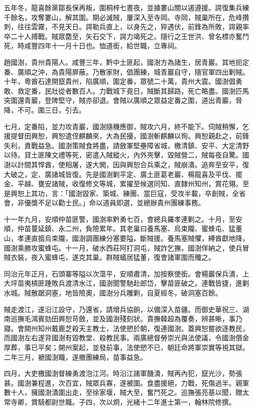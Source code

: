 \begin{pinyinscope}
五年冬，龍喜餘黨鄒長保再叛，圍桐梓七晝夜，並據婁山關以遏遵援。諤復集兵練千餘名，攻奪婁山，解其圍。期必滅賊，屢深入至寺岡。寺岡，賊巢所在，危峰攢刺，往往雲霧，不見天日。諤勒兵直上，以身先之，猝遇伏，前鋒為所敗，諤親率卒二十人搏戰。賊眾麕至，矢石交下，諤力竭死之。隨行之王世洪、曾名標亦奮鬥死，時咸豐四年十一月十日也。恤道銜，給世職，立專祠。

趙國澍，貴州貴陽人。咸豐三年，黔中土匪起，國澍方為諸生，居青巖。其地扼定番、廣順之沖，為貴陽屏蔽。乃散家財，倡團練，城青巖自守，隨官軍四出剿賊。十年，粵酋石達開竄貴州，陷廣順，圍定番，眾號二十萬，貴州大震。國澍倡勇敢、救定番，民壯從者數百人。力戰城下竟日，賊斷其歸路，死亡略盡。國澍匹馬突圍還青巖，登陴堅守，賊亦卻退。會賊以廣順之眾益定番之圍，道出青巖，脅降，不可。圍三日，引去。

七月，定番陷，並力攻青巖，國澍隨機應御，賊攻六月，終不能下。伺賊稍懈，乞援提督田興恕，興恕遣侄麒麟來，大為民擾，國澍斬麒麟以徇。興恕親赴之，前鋒失利，責戰益急。國澍策賊食將盡，請斂軍堅壘障省城，檄清鎮、安平、大定清野以待。貸土匪陳文禮等死，密遣入賊縱火，內外夾擊，毀賊營二，賊每夜自驚。國澍以計間其悍酋，使相屠，遂大閧，因與興恕合兵乘之，賊崩潰。追奔至安平，復大破之，定、廣諸城皆復。先是國澍剿平定、廣土匪葛老巖、楊龍喜及平伐、擺金、平越、甕安諸賊，收復修文等城，累擢至候選同知、直隸州知州，賞花翎。至是興恕上其功，言：「國澍毀家、築城、練團、當巨寇，受攻半載，卒創賊，全省會，非優獎不足以勸士民。」命以道員即選，並總辦貴州團練事務。

十一年九月，安順仲苗匪警，國澍率黔勇七百，會總兵羅孝連剿之。十月，至安順，仲苗蔓延鎮、永二州，負險累年。其老巢曰養馬塞、烏束隴、蜜蜂屯、猛董山，孝連直搗烏束隴，國澍調團練分塞要隘，斷賊援。養馬塞賊懼，縛酋獻地降，國澍乘勝攻蜜蜂屯。十一月，破水西莊阿打洞屯，賊詐乞撫，國澍佯納之，使兵冒賊衣裝，夜入蜜蜂屯，遂克其巢。群賊蟻居猛董，復會諸軍圍而殲之。

同治元年正月，石頭寨等隘以次蕩平，安順肅清，加按察使銜。會楊巖保兵潰，上大坪苗夷槓匪踵敗兵渡清水江，國澍聞警馳赴郎岱，擊苗匪破之。連戰皆捷，進剿水城。賊散踞洞塞，地皆險奧，國澍分兵雕剿，自夏經冬，破洞塞百餘。

賊走渡江，遂沿江設守，乃還省，請增兵協餉，以備深入苗疆。而御史華祝三、湖南巡撫毛鴻賓劾田興恕苛斂，並及國澍殘刻狀。貴撫韓超為覆奏，辨甚晰，事乃寢。會開州知州戴鹿芝殺天主教士，法使愬於朝，復連國澍。蓋興恕嘗欲逐教民，而國澍左右遂背國澍有毀教堂、殺教民事。兩廣總督勞崇光與法使議，令國澍償金厚葬，事已平矣；開州案起，並發前事，法使愬不已，朝廷命將軍崇實等視其獄。二年三月，褫國澍職，遂撤團練局，苗事益急。

四月，大吏檄國澍督練勇渡泡江河。時沿江諸軍饑潰，賊再內犯，竄光沙，勢張甚。國澍兼程進，次百宜，賊眾兵寡，遂被圍。食盡援絕，力戰，死傷過半。親軍數十人，擁國澍潰圍出走，至徐家堰，賊大至，奮鬥死之。巡撫張亮基以聞，贈太常寺卿，賞騎都尉世職。子四，次以炯，光緒十二年進士第一，翰林院修撰。


\end{pinyinscope}
